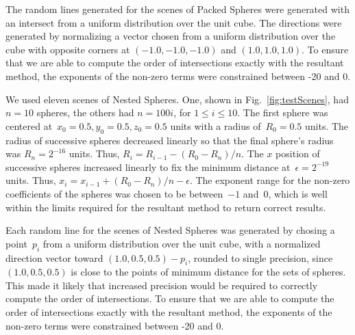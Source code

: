 \documentclass{cccg16}
\begin{document}
The random lines generated for the scenes of Packed Spheres were
generated with an intersect from a uniform distribution over the unit
cube.  The directions were generated by normalizing a vector chosen
from a uniform distribution over the cube with opposite corners at
$(-1.0, -1.0, -1.0)$ and $(1.0, 1.0, 1.0)$.  To ensure that we are
able to compute the order of intersections exactly with the resultant
method, the exponents of the non-zero terms were constrained between
-20 and 0.

We used eleven scenes of Nested Spheres. One, shown in
Fig.~\ref{fig:testScenes}, had $n=10$ spheres, the others had
$n=100i$, for $1\leq i \leq 10$.  The first sphere was centered
at~$x_0=0.5, y_0=0.5, z_0=0.5$ units with a radius of~$R_0=0.5$ units.
The radius of successive spheres decreased linearly so that the final
sphere's radius was $R_n=2^{-16}$ units.  Thus,
$R_i=R_{i-1}-(R_0-R_n)/n$.  The $x$ position of successive spheres
increased linearly to fix the minimum distance at~$\epsilon=2^{-19}$
units. Thus, $x_i=x_{i-1}+(R_0-R_n)/n-\epsilon$.  The exponent range
for the non-zero coefficients of the spheres was chosen to be
between~$-1$ and~$0$, which is well within the limits required for the
resultant method to return correct results.

Each random line for the scenes of Nested Spheres was generated by
chosing a point~$p_i$ from a uniform distribution over the unit cube,
with a normalized direction vector toward $(1.0, 0.5, 0.5)-p_i$,
rounded to single precision, since $(1.0, 0.5, 0.5)$ is close to the
points of minimum distance for the sets of spheres.  This made it
likely that increased precision would be required to correctly compute
the order of intersections.  To ensure that we are able to compute the
order of intersections exactly with the resultant method, the
exponents of the non-zero terms were constrained between -20 and 0.
\end{document}
